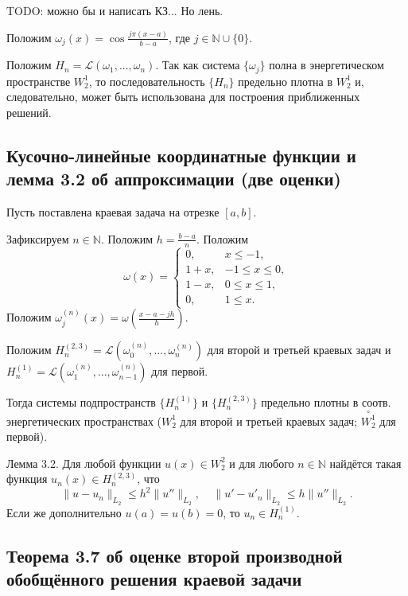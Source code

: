 \documentclass[a4paper,14pt]{article} %
\begin{document}
TODO: можно бы и написать КЗ... Но лень.

Положим $\omega_j(x) = \cos\frac{j\pi(x-a)}{b-a}$,
где $j\in\mathbb{N}\cup\{0\}$.

Положим $H_n = \mathcal{L}(\omega_1, ..., \omega_n)$.
Так как система $\{\omega_j\}$ полна в энергетическом пространстве $W^1_2$,
то последовательность $\{H_n\}$ предельно плотна в $W^1_2$ и, следовательно,
может быть использована для построения приближенных решений.



\subsection{Кусочно-линейные координатные функции и лемма 3.2 об аппроксимации (две оценки)}

Пусть поставлена краевая задача на отрезке $[a,b]$.

Зафиксируем $n \in \mathbb{N}$.
Положим $h=\frac{b-a}{n}$.
Положим
\begin{equation}
	\omega(x) = \begin{cases}
		0,   & x \leq -1,
		\\
		1+x, & -1 \leq x \leq 0,
		\\
		1-x, &  0 \leq x \leq 1,
		\\
		0,   & 1 \leq x
		.
	\end{cases}
\end{equation}
Положим $\omega^{(n)}_j(x) = \omega\left(\frac{x-a-jh}{h}\right)$.

Положим $H_n^{(2,3)} = \mathcal{L}\left(\omega^{(n)}_0, ..., \omega^{(n)}_n\right)$
для второй и третьей краевых задач и
$H_n^{(1)} = \mathcal{L}\left(\omega^{(n)}_1, ..., \omega^{(n)}_{n-1}\right)$
для первой.

Тогда системы подпространств $\{H_n^{(1)}\}$ и $\{H_n^{(2,3)}\}$ предельно плотны в соотв. энергетических пространствах
($W^1_2$ для второй и третьей краевых задач; $\overset{\circ}{W^1_2}$ для первой).

Лемма 3.2.
Для любой функции $u(x)\in W^2_2$ и для любого $n\in\mathbb{N}$ найдётся такая функция $u_n(x)\in H^{(2,3)}_n$,
что
\begin{equation}
	\| u  - u _n\|_{L_2} \leq h^2 \|u''\|_{L_2}
	,
	~~~~~
	\| u' - u'_n\|_{L_2} \leq h   \|u''\|_{L_2}
	.
\end{equation}
Если же дополнительно $u(a)=u(b)=0$, то $u_n\in H^{(1)}_n$.

\subsection{Теорема 3.7 об оценке второй производной обобщённого решения краевой задачи}
\end{document}
